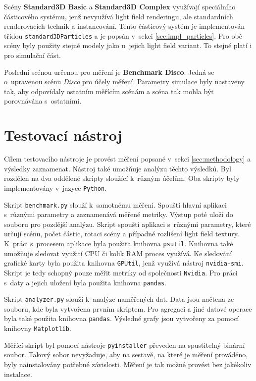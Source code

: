 Scény \textbf{Standard3D Basic} a \textbf{Standard3D Complex} využívají speciálního částicového systému, jenž nevyužívá light field renderingu, ale standardních renderovacích technik a instancování. Tento částicový systém je implementován třídou \texttt{standard3DParticles} a je popsán v~sekci \ref{sec:impl_particles}. Pro obě scény byly použity stejné modely jako u~jejich light field variant. To stejné platí i pro simulační část. 

Poslední scénou určenou pro měření je \textbf{Benchmark Disco}. Jedná se o~upravenou scénu \emph{Disco} pro účely měření. Parametry simulace byly nastaveny tak, aby odpovídaly ostatním měřícím scénám a scéna tak mohla být porovnávána s~ostatními. 
\section{Testovací nástroj}
\label{sec_benchmark_impl}
Cílem testovacího nástroje je provést měření popsané v~sekci \ref{sec:methodology} a výsledky zaznamenat. Nástroj také umožňuje analýzu těchto výsledků. Byl rozdělen na dva oddělené skripty sloužící k~různým účelům. Oba skripty byly implementovány v~jazyce \texttt{Python}.

Skript \texttt{benchmark.py} slouží k~samotnému měření. Spouští hlavní aplikaci s~různými parametry a zaznamenává měřené metriky. Výstup poté uloží do souboru pro pozdější analýzu. Skript spouští aplikaci s~různými parametry, které určují scénu, počet částic, rotaci scény a případné rozlišení light field textury. K~práci s~procesem aplikace byla použita knihovna \texttt{psutil}. Knihovna také umožňuje sledovat využití CPU či kolik RAM proces využívá. Ke sledování grafické karty byla použita knihovna \texttt{GPUtil}, jenž využívá nástroj \texttt{nvidia-smi}. Skript je tedy schopný pouze měřit metriky od společnosti \texttt{Nvidia}. Pro práci s~daty a jejich uložení byla použita knihovna \texttt{pandas}.

Skript \texttt{analyzer.py} slouží k~analýze naměřených dat. Data jsou načtena ze souboru, kde byla vytvořena prvním skriptem. Pro agregaci a jiné datové operace byla také použita knihovna \texttt{pandas}. Výsledné grafy jsou vytvořeny za pomocí knihovny \texttt{Matplotlib}.

Měřící skript byl pomocí nástroje \texttt{pyinstaller} převeden na spustitelný binární soubor. Takový sobor nevyžaduje, aby na sestavě, na které je měření prováděno, byly nainstalovány potřebné závislosti. Měření je tak možné provést bez jakékoliv instalace.




